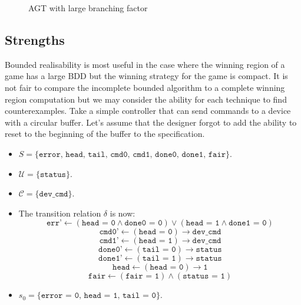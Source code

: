 \begin{figure}
    \caption{AGT with large branching factor}
    \label{fig:limitationexample}
\end{figure}

\subsection{Strengths}

Bounded realisability is most useful in the case where the winning region of a game has a large BDD but the winning strategy for the game is compact. It is not fair to compare the incomplete bounded algorithm to a complete winning region computation but we may consider the ability for each technique to find counterexamples. Take a simple controller that can send commands to a device with a circular buffer. Let's assume that the designer forgot to add the ability to reset to the beginning of the buffer to the specification.

\begin{itemize}
    \item $S = \{ \texttt{error, head, tail, cmd0, cmd1, done0, done1, fair} \} $.
    \item $\mathcal{U} = \{ \texttt{status} \} $. 
    \item $\mathcal{C} = \{ \texttt{dev\_cmd} \}$.
    \item The transition relation $\delta$ is now: 
        $$ \texttt{err'} \gets (\texttt{head = 0} \land \texttt{done0 = 0}) \lor (\texttt{head = 1} \land \texttt{done1 = 0})$$
        $$ \texttt{cmd0'} \gets (\texttt{head = 0}) \to \texttt{dev\_cmd} $$
        $$ \texttt{cmd1'} \gets (\texttt{head = 1}) \to \texttt{dev\_cmd} $$
        $$ \texttt{done0'} \gets (\texttt{tail = 0}) \to \texttt{status} $$
        $$ \texttt{done1'} \gets (\texttt{tail = 1}) \to \texttt{status} $$
        $$ \texttt{head} \gets (\texttt{head = 0}) \to \texttt{1} $$
        $$ \texttt{fair} \gets (\texttt{fair = 1}) \land (\texttt{status = 1}) $$
    \item $s_0 = \{ \texttt{error = 0, head = 1, tail = 0} \}$. 
\end{itemize}


